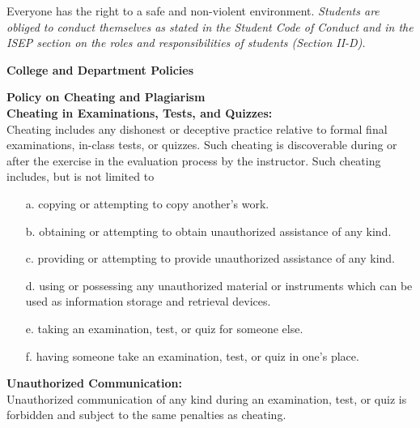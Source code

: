 \documentclass[10pt]{article}
\begin{document}
\noindent Everyone has the right to a safe and non-violent environment. \textit{Students are obliged to conduct themselves as stated in the Student Code of Conduct and in the ISEP section on the roles and responsibilities of
students (Section II-D).}  \\

\vspace*{\fill}

\newpage
\vspace*{\fill}

\large{\textbf{College and Department Policies}}\\
\vspace{-0.15in}\hline \bigskip \normalsize

\setlength{\columnsep}{30pt}
\begin{multicols}{2}

\large{\textbf{Policy on Cheating and Plagiarism}}\\
\vspace{-0.15in}\hline \bigskip \normalsize
\textbf{Cheating in Examinations, Tests, and Quizzes:}\\
Cheating includes any dishonest or deceptive practice relative to
formal final examinations, in-class tests, or quizzes. Such cheating
is discoverable during or after the exercise in the evaluation
process by the instructor. Such cheating includes, but is not limited
to\vspace{-0.1in}
\begin{enumerate}\addtolength{\itemsep}{-0.5\baselineskip}
\item[a.] copying or attempting to copy another's work.
\item[b.] obtaining or attempting to obtain unauthorized assistance of any kind.
\item[c.] providing or attempting to provide unauthorized assistance of any kind.
\item[d.] using or possessing any unauthorized material or instruments which can be used as information storage and retrieval devices.
\item[e.] taking an examination, test, or quiz for someone else.
\item[f.] having someone take an examination, test, or quiz in one's place. \smallskip
\end{enumerate}\vspace{-0.1in}

\textbf{Unauthorized Communication:}\\
Unauthorized communication of any kind during an examination,
test, or quiz is forbidden and subject to the same penalties as
cheating.\\\vspace{-0.1in}


\end{multicols}
\end{document}
